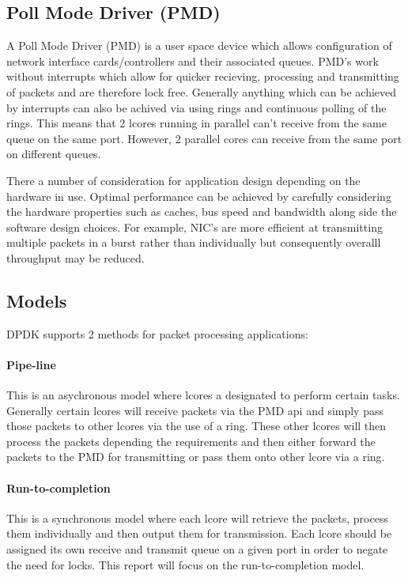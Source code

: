 \documentclass[final_report.tex]{subfiles}
\begin{document}
\subsection{Poll Mode Driver (PMD)}
A Poll Mode Driver (PMD) is a user space device which allows configuration of network interface cards/controllers and their associated queues. PMD's work without interrupts which allow for quicker recieving, processing and transmitting of packets and are therefore lock free. Generally anything which can be achieved by interrupts can also be achived via using rings and continuous polling of the rings. This means that 2 lcores running in parallel can't receive from the same queue on the same port. However, 2 parallel cores can receive from the same port on different queues.

There a number of consideration for application design depending on the hardware in use. Optimal performance can be achieved by carefully considering the hardware properties such as caches, bus speed and bandwidth along side the software design choices. For example, NIC's are more efficient at transmitting multiple packets in a burst rather than individually but consequently overalll throughput may be reduced.

\subsection{Models}
DPDK supports 2 methods for packet processing applications:

\paragraph*{Pipe-line}
This is an asychronous model where lcores a designated to perform certain tasks. Generally certain lcores will receive packets via the PMD api and simply pass those packets to other lcores via the use of a ring. These other lcores will then process the packets depending the requirements and then either forward the packets to the PMD for transmitting or pass them onto other lcore via a ring.

\paragraph*{Run-to-completion}
This is a synchronous model where each lcore will retrieve the packets, process them individually and then output them for transmission. Each lcore should be assigned its own receive and transmit queue on a given port in order to negate the need for locks. This report will focus on the run-to-completion model.
\end{document}
